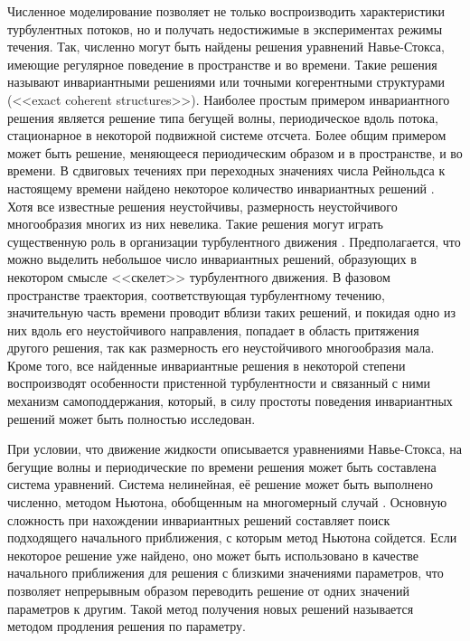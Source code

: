 Численное моделирование позволяет не только воспроизводить характеристики турбулентных потоков, но и получать недостижимые в экспериментах режимы течения. Так, численно могут быть найдены решения уравнений Навье-Стокса, имеющие регулярное поведение в пространстве и во времени. Такие решения называют инвариантными решениями или точными когерентными структурами (<<exact coherent structures>>). Наиболее простым примером инвариантного решения является решение типа бегущей волны, периодическое вдоль потока, стационарное в некоторой подвижной системе отсчета. Более общим примером может быть решение, меняющееся периодическим образом и в пространстве, и во времени. В сдвиговых течениях при переходных значениях числа Рейнольдса к настоящему времени найдено некоторое количество инвариантных решений \cite{Kawahara2012}. Хотя все известные решения неустойчивы, размерность неустойчивого многообразия многих из них невелика. Такие решения могут играть существенную роль в организации турбулентного движения \cite{Chaosbook}. Предполагается, что можно выделить небольшое число инвариантных решений, образующих в некотором смысле <<скелет>> турбулентного движения. В фазовом пространстве траектория, соответствующая турбулентному течению, значительную часть времени проводит вблизи таких решений, и покидая одно из них вдоль его неустойчивого направления, попадает в область притяжения другого решения, так как размерность его неустойчивого многообразия мала. Кроме того, все найденные инвариантные решения в некоторой степени воспроизводят особенности пристенной турбулентности и связанный с ними механизм самоподдержания, который, в силу простоты поведения инвариантных решений может быть полностью исследован. 

При условии, что движение жидкости описывается уравнениями Навье-Стокса, на бегущие волны и периодические по времени решения может быть составлена система уравнений. Система нелинейная, её решение может быть выполнено численно, методом Ньютона, обобщенным на многомерный случай \cite{Viswanath2007, Dijkstra2014}. Основную сложность при нахождении инвариантных решений составляет поиск подходящего начального приближения, с которым метод Ньютона сойдется. Если некоторое решение уже найдено, оно может быть использовано в качестве начального приближения для решения с близкими значениями параметров, что позволяет непрерывным образом переводить решение от одних значений параметров к другим. Такой метод получения новых решений называется методом продления решения по параметру. 

